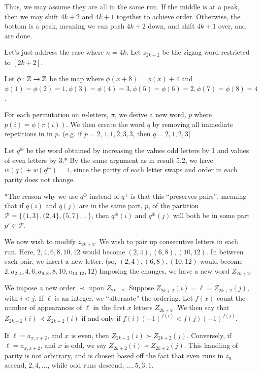 \documentclass{article}
\begin{document}
Thus, we may assume they are all in the same run. If the middle is at a peak, then we may shift $4k+2$ and $4k+1$ together to achieve order. Otherwise, the bottom is a peak, meaning we can push $4k+2$ down, and shift $4k+1$ over, and are done.


\iffalse
Let's just address the case where $n = 4k$. Let $z_{2k+2}$ be the zigzag word restricted to $[2k+2]$.

Let $\phi:\Bbb{Z} \to \Bbb{Z}$ be the map where $\phi(x+8) = \phi(x) +4$ and $\phi(1) = \phi(2) = 1, \phi(3) = \phi(4) = 3, \phi(5) = \phi(6) = 2, \phi(7) = \phi(8) = 4$. 

For each permutation on $n$-letters, $\pi$, we derive a new word, $p$ where $p(i) = \phi(\pi(i))$. We then create the word $q$ by removing all immediate repetitions in in $p$. (e.g. if $p = 2,1,1,2,3,3$, then $q = 2,1,2,3$)

Let $q^\oplus$ be the word obtained by increasing the values odd letters by 1 and values of even letters by 3.* By the same argument as in result 5.2, we have $w(q)+w(q^\oplus) = 1$, since the parity of each letter swaps and order in each parity does not change.

*The reason why we use $q^\oplus$ instead of $q^+$ is that this ``preserves pairs'', meaning that if $q(i)$ and $q(j)$ are in the same part, $p$, of the partition $\mathcal{P} = \{ \{1,3\}, \{2,4\},\{5,7\},\dots\}$, then $q^\oplus(i)$ and $q^\oplus(j)$ will both be in some part $p' \in \mathcal{P}$.

We now wish to modify $z_{2k+2}$. We wish to pair up consecutive letters in each run. Here, $2,4,6,8,10,12$ would become $(2,4),(6,8),(10,12)$. In between each pair, we insert a new letter. (so, $(2,4),(6,8),(10,12)$ would become $2,a_{2,4},4, 6,a_{6,8},8,10,a_{10,12},12$) Imposing the changes, we have a new word $Z_{2k+2}$. 

We impose a new order $\prec$ upon $Z_{2k+2}$. Suppose $Z_{2k+2}(i) = \ell = Z_{2k+2}(j)$, with $i < j$. If $\ell$ is an integer, we ``alternate'' the ordering. Let $f(x)$ count the number of appearances of $\ell$ in the first $x$ letters $Z_{2k+2}$. We then say that $Z_{2k+2}(i) \prec Z_{2k+2}(i)$ if and only if $f(i)(-1)^{f(i)} < f(j)(-1)^{f(j)}$.

If $\ell = a_{x,x+2}$, and $x$ is even, then $Z_{2k+2}(i) \succ Z_{2k+2}(j)$. Conversely, if $\ell = a_{x,x+2}$, and $x$ is odd, we say $Z_{2k+2}(i) \prec Z_{2k+2}(j)$. This handling of parity is not arbitrary, and is chosen based off the fact that even runs in $z_n$ ascend, $2,4,\dots$, while odd runs descend, $\dots, 5,3,1$.
\end{document}
